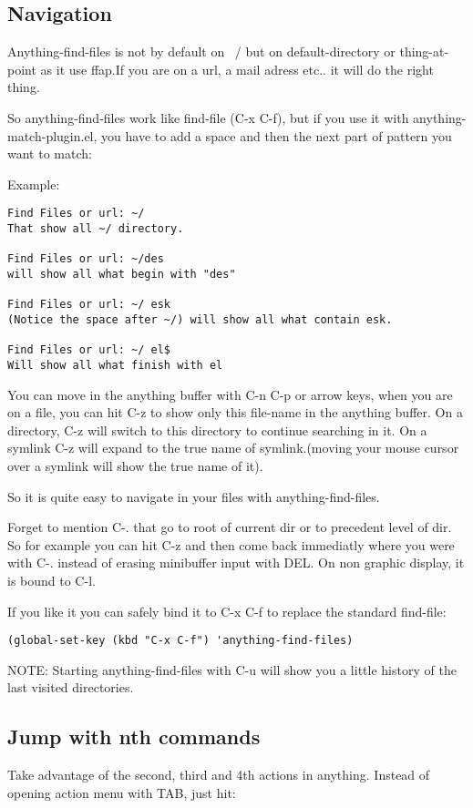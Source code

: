 \documentclass[a4paper,11pt]{article}
\begin{document}
\subsection{Navigation}
\label{sec:navigation}
Anything-find-files is not by default on ~/ but on default-directory or
thing-at-point as it use ffap.If you are on a url, a mail adress
etc.. it will do the right thing.

So anything-find-files work like find-file (C-x C-f), but if you use it
with anything-match-plugin.el, you have to add a space and then the next
part of pattern you want to match:

Example:

\begin{verbatim}
Find Files or url: ~/
That show all ~/ directory.

Find Files or url: ~/des
will show all what begin with "des"

Find Files or url: ~/ esk
(Notice the space after ~/) will show all what contain esk.

Find Files or url: ~/ el$
Will show all what finish with el

\end{verbatim}
You can move in the anything buffer with C-n C-p or arrow keys, when you
are on a file, you can hit C-z to show only this file-name in the
anything buffer.
On a directory, C-z will switch to this directory to continue searching
in it.
On a symlink C-z will expand to the true name of symlink.(moving your
mouse cursor over a symlink will show the true name of it).

So it is quite easy to navigate in your files with anything-find-files.

Forget to mention C-. that go to root of current dir or to precedent
level of dir.
So for example you can hit C-z and then come back immediatly where you
were with C-. instead of erasing minibuffer input with DEL.
On non graphic display, it is bound to C-l.

If you like it you can safely bind it to C-x C-f to replace the standard
find-file:

\begin{verbatim}
(global-set-key (kbd "C-x C-f") 'anything-find-files)
\end{verbatim}

NOTE:
Starting anything-find-files with C-u will show you a little history of the last visited directories.


\subsection{Jump with nth commands}
\label{sec:jump-with-nth}
Take advantage of the second, third and 4th actions in anything.
Instead of opening action menu with TAB, just hit:
\end{document}
